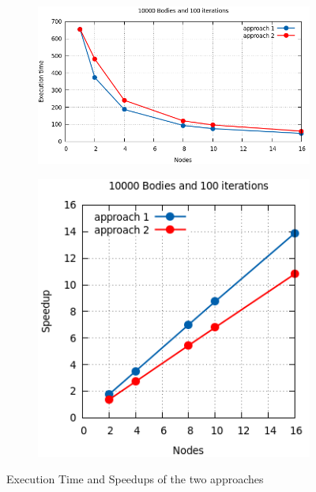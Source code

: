 \documentclass[a4paper]{article}
\begin{document}
\begin{figure}[ht]
\begin{subfigure}{.4\textwidth}
\end{subfigure} \\ %
\begin{subfigure}{.6\textwidth}
  \centering
  \includegraphics[width=1\linewidth]{results/graph2}
\end{subfigure} %
\begin{subfigure}{.4\textwidth}
  \centering
  \includegraphics[width=1\linewidth]{results/graph2_sp}
\end{subfigure}
  \caption{Execution Time and Speedups of the two approaches}
  \label{fig:G1}
\end{figure}
\FloatBarrier
\end{document}
